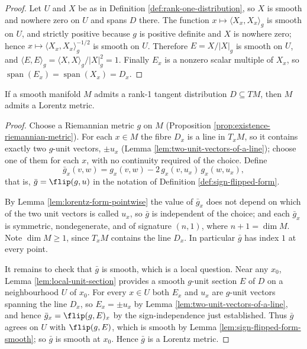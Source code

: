 \begin{proof}
\leanok
{}
Let $U$ and $X$ be as in Definition \ref{def:rank-one-distribution}, so $X$ is smooth and nowhere zero on $U$ and spans $D$ there. The function $x \mapsto \langle X_x, X_x\rangle_g$ is smooth on $U$, and strictly positive because $g$ is positive definite and $X$ is nowhere zero; hence $x \mapsto \langle X_x, X_x\rangle_g^{-1/2}$ is smooth on $U$. Therefore $E = X/|X|_g$ is smooth on $U$, and $\langle E,E\rangle_g = \langle X,X\rangle_g / |X|_g^2 = 1$. Finally $E_x$ is a nonzero scalar multiple of $X_x$, so $\operatorname{span}(E_x) = \operatorname{span}(X_x) = D_x$.
\end{proof}

\begin{proposition}
\label{prop:lorentz-metric-of-rank-one-distribution}
\leanok
{}
If a smooth manifold $M$ admits a rank-1 tangent distribution $D \subseteq TM$, then $M$ admits a Lorentz metric.
\end{proposition}

\begin{proof}
\leanok
{}
Choose a Riemannian metric $g$ on $M$ (Proposition \ref{prop:existence-riemannian-metric}). For each $x \in M$ the fibre $D_x$ is a line in $T_xM$, so it contains exactly two $g$-unit vectors, $\pm u_x$ (Lemma \ref{lem:two-unit-vectors-of-a-line}); choose one of them for each $x$, with no continuity required of the choice. Define
\[
  \bar{g}_x(v,w) = g_x(v,w) - 2\,g_x(v,u_x)\,g_x(w,u_x),
\]
that is, $\bar g = \flip(g,u)$ in the notation of Definition \ref{def:sign-flipped-form}.

By Lemma \ref{lem:lorentz-form-pointwise} the value of $\bar g_x$ does not depend on which of the two unit vectors is called $u_x$, so $\bar{g}$ is independent of the choice; and each $\bar{g}_x$ is symmetric, nondegenerate, and of signature $(n,1)$, where $n+1 = \dim M$. Note $\dim M \geq 1$, since $T_xM$ contains the line $D_x$. In particular $\bar{g}$ has index $1$ at every point.

It remains to check that $\bar{g}$ is smooth, which is a local question. Near any $x_0$, Lemma \ref{lem:local-unit-section} provides a smooth $g$-unit section $E$ of $D$ on a neighbourhood $U$ of $x_0$. For every $x \in U$ both $E_x$ and $u_x$ are $g$-unit vectors spanning the line $D_x$, so $E_x = \pm u_x$ by Lemma \ref{lem:two-unit-vectors-of-a-line}, and hence $\bar g_x = \flip(g,E)_x$ by the sign-independence just established. Thus $\bar g$ agrees on $U$ with $\flip(g,E)$, which is smooth by Lemma \ref{lem:sign-flipped-form-smooth}; so $\bar g$ is smooth at $x_0$. Hence $\bar{g}$ is a Lorentz metric.
\end{proof}

